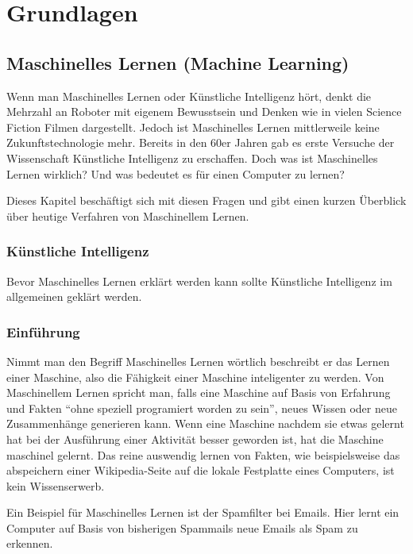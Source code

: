 \chapter{Grundlagen}

\section{Maschinelles Lernen (Machine Learning)}

    Wenn man Maschinelles Lernen oder Künstliche Intelligenz hört, denkt die Mehrzahl an Roboter mit eigenem Bewusstsein und Denken wie in vielen Science Fiction Filmen dargestellt.
    Jedoch ist Maschinelles Lernen mittlerweile keine Zukunftstechnologie mehr.
    Bereits in den 60er Jahren gab es erste Versuche der Wissenschaft Künstliche Intelligenz zu erschaffen.
    Doch was ist Maschinelles Lernen wirklich? Und was bedeutet es für einen Computer zu lernen?
    \newline

    \noindent
    Dieses Kapitel beschäftigt sich mit diesen Fragen und gibt einen kurzen Überblick über heutige Verfahren von Maschinellem Lernen.

    \subsection{Künstliche Intelligenz}
    Bevor Maschinelles Lernen erklärt werden kann sollte Künstliche Intelligenz im allgemeinen geklärt werden.


    \subsection{Einführung}
    Nimmt man den Begriff Maschinelles Lernen wörtlich beschreibt er das Lernen einer Maschine, also die Fähigkeit einer Maschine inteligenter zu werden.
    Von Maschinellem Lernen spricht man, falls eine Maschine auf Basis von Erfahrung und Fakten "`ohne speziell programiert worden zu sein"'\cite[20]{HandsOnML}, neues Wissen oder neue Zusammenhänge generieren kann.
    Wenn eine Maschine nachdem sie etwas gelernt hat bei der Ausführung einer Aktivität besser geworden ist, hat die Maschine maschinel gelernt\cite[20]{HandsOnML}.
    Das reine auswendig lernen von Fakten, wie beispielsweise das abspeichern einer Wikipedia-Seite auf die lokale Festplatte eines Computers, ist kein Wissenserwerb.
    \newline

    \noindent
    Ein Beispiel für Maschinelles Lernen ist der Spamfilter bei Emails.
    Hier lernt ein Computer auf Basis von bisherigen Spammails neue Emails als Spam zu erkennen.
    \newline

